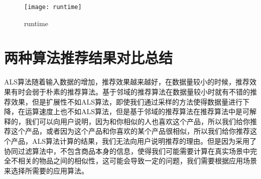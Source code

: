\begin{figure}[ht]
\centering
\texttt{[image: runtime]}
\caption{runtime}\label{fig:runtime}
\end{figure}

\section{两种算法推荐结果对比总结}
ALS算法随着输入数据的增加，推荐效果越来越好，在数据量较小的时候，推荐效果有时会弱于朴素的推荐算法。基于邻域的推荐算法在数据量较小时就有不错的推荐效果，但是扩展性不如ALS算法，即使我们通过采样的方法使得数据量进行下降，在运算速度上也不如ALS算法，但是基于邻域的推荐算法在推荐算法中是可解释的，我们可以向用户说明，因为和你相似的人也喜欢这个产品，所以我们给你推荐这个产品，或者因为这个产品和你喜欢的某个产品很相似，所以我们给你推荐这个产品，ALS算法计算的结果，我们无法向用户说明推荐的理由。但是因为采用了协同过滤算法中，不包含商品本身的信息，使得我们可能需要计算在真实场景中完全不相关的物品之间的相似性，这可能会导致一定的问题，我们需要根据应用场景来选择所需要的应用算法。
